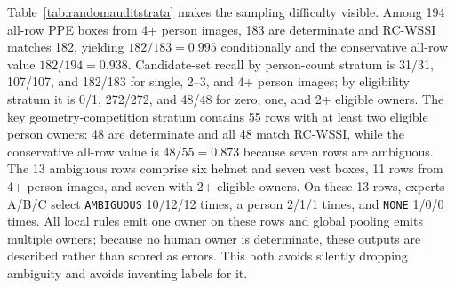 \documentclass[iicol,pdflatex,sn-mathphys-num]{sn-jnl}
\begin{document}
\begin{table}[t]
\caption{Open-candidate, source-stratified random human ownership audit. The 66 pre-frozen images contain 334 PPE boxes from all 11 filename groups. Conditional exact scoring excludes 13 three-pass \texttt{AMBIGUOUS} rows, leaving 321 determinate owner rows. ``All-row lower'' instead counts each ambiguous row as a non-match; it is conservative sensitivity, not a known-error estimate. Exact requires equality of the predicted and blind-majority human owner sets. Brackets are descriptive filename-group resampling intervals, not cluster-valid confidence intervals.}
\label{tab:randomaudit}
\centering
\scriptsize
\setlength{\tabcolsep}{4pt}
\end{table}

Table~\ref{tab:randomauditstrata} makes the sampling difficulty visible. Among 194 all-row PPE boxes from 4+ person images, 183 are determinate and RC-WSSI matches 182, yielding $182/183=0.995$ conditionally and the conservative all-row value $182/194=0.938$. Candidate-set recall by person-count stratum is 31/31, 107/107, and 182/183 for single, 2--3, and 4+ person images; by eligibility stratum it is 0/1, 272/272, and 48/48 for zero, one, and 2+ eligible owners. The key geometry-competition stratum contains 55 rows with at least two eligible person owners: 48 are determinate and all 48 match RC-WSSI, while the conservative all-row value is $48/55=0.873$ because seven rows are ambiguous. The 13 ambiguous rows comprise six helmet and seven vest boxes, 11 rows from 4+ person images, and seven with 2+ eligible owners. On these 13 rows, experts A/B/C select \texttt{AMBIGUOUS} 10/12/12 times, a person 2/1/1 times, and \texttt{NONE} 1/0/0 times. All local rules emit one owner on these rows and global pooling emits multiple owners; because no human owner is determinate, these outputs are described rather than scored as errors. This both avoids silently dropping ambiguity and avoids inventing labels for it.
\end{document}
